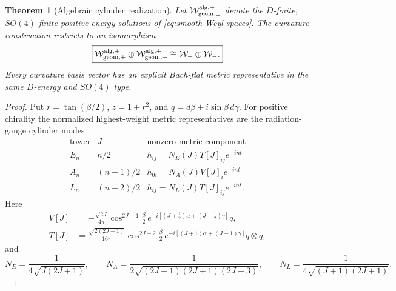 \documentclass[11pt]{article}
\newtheorem{theorem}{Theorem}[section]
\theoremstyle{definition}
\theoremstyle{remark}
\newcommand{\W}{\mathcal W}
\begin{document}
\begin{theorem}[Algebraic cylinder realization]\label{thm:algebraic-cylinder}
Let $\mathcal W_{{\rm geom},\pm}^{\rm alg,+}$ denote the $D$-finite,
$SO(4)$-finite positive-energy solutions of
\eqref{eq:smooth-Weyl-spaces}.  The curvature construction restricts to an
isomorphism
\begin{equation}\label{eq:local-target}
 \boxed{
 \mathcal W_{{\rm geom},+}^{\rm alg,+}
 \oplus\mathcal W_{{\rm geom},-}^{\rm alg,+}
 \cong\W_+\oplus\W_-.}
\end{equation}
Every curvature basis vector has an explicit Bach-flat metric representative
in the same $D$-energy and $SO(4)$ type.
\end{theorem}

\begin{proof}
Put $r=\tan(\beta/2)$, $z=1+r^2$, and
$q=d\beta+i\sin\beta\,d\gamma$.  For positive chirality the normalized
highest-weight metric representatives are the radiation-gauge cylinder
modes
\begin{equation}\label{eq:metric-preimage-families}
 \begin{array}{c|c|c}
  \text{tower}&J&\text{nonzero metric component}\\
  \hline
  E_n&n/2&h_{ij}=N_E(J)T[J]_{ij}e^{-int}\\
  A_n&(n-1)/2&h_{0i}=N_A(J)V[J]_ie^{-int}\\
  L_n&(n-2)/2&h_{ij}=N_L(J)T[J]_{ij}e^{-int}.
 \end{array}
\end{equation}
Here
\begin{align}
 V[J]&=-\frac{\sqrt{2J}}{4\pi}
 \cos^{2J-1}\!\frac\beta2\,
 e^{-i[(J+\frac12)\alpha+(J-\frac12)\gamma]}q,\nonumber\\
 T[J]&=\frac{\sqrt{2(2J-1)}}{16\pi}
 \cos^{2J-2}\!\frac\beta2\,
 e^{-i[(J+1)\alpha+(J-1)\gamma]}q\otimes q,
 \label{eq:metric-preimage-harmonics}
\end{align}
and
\begin{equation}
 N_E=\frac1{4\sqrt{J(2J+1)}},\qquad
 N_A=\frac1{2\sqrt{(2J-1)(2J+1)(2J+3)}},\qquad
 N_L=\frac1{4\sqrt{(J+1)(2J+1)}}.
\end{equation}


\end{proof}
\end{document}
